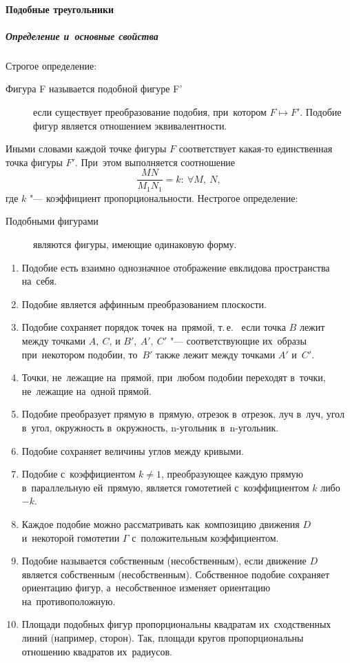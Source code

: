 \documentclass[]{scrartcl}
\begin{document}
\paragraph{Подобные треугольники}
\subparagraph{Определение и~основные свойства}
Строгое определение:
\begin{description}
	\item[Фигура F называется подобной фигуре F'] если существует преобразование подобия, при~котором ${\textstyle F \mapsto F'}$. Подобие фигур является отношением эквивалентности.
\end{description}
Иными словами каждой точке фигуры $\textstyle F$ соответствует какая-то единственная точка фигуры $\textstyle F'$. При~этом выполняется соотношение
\begin{equation}\label{eq:similar-figures-1}
\frac{MN}{M_{1}N_{1}}=k:\ \forall M,\ N,
\end{equation}
где $\textstyle k$ "--- коэффициент пропорциональности.
Нестрогое определение:
\begin{description}
	\item[Подобными фигурами] являются фигуры, имеющие одинаковую форму. 
\end{description}

\begin{enumerate}
	\item Подобие есть взаимно однозначное отображение евклидова пространства на~себя.
	\item Подобие является аффинным преобразованием плоскости.
	\item Подобие сохраняет порядок точек на~прямой, т.\,е.~ если точка ${\textstyle B}$ лежит между точками ${\textstyle A,\ C}$, и ${\textstyle B',\ A',\ C'}$ "--- соответствующие их~образы при~некотором подобии, то~${\textstyle B'}$ также лежит между точками ${\textstyle A'}$ и~${\textstyle C'}$.
	\item Точки, не~лежащие на~прямой, при~любом подобии переходят в~точки, не~лежащие на~одной прямой.
	\item Подобие преобразует прямую в~прямую, отрезок в~отрезок, луч в~луч, угол в~угол, окружность в~окружность, n-угольник в~n-угольник.
	\item Подобие сохраняет величины углов между кривыми.
	\item Подобие с~коэффициентом ${\textstyle k\not =1}$, преобразующее каждую прямую в~параллельную ей~прямую, является гомотетией с~коэффициентом ${\textstyle k}$ либо ${\textstyle -k}$.
	\item Каждое подобие можно рассматривать как~композицию движения ${\textstyle D}$ и~некоторой гомотетии ${\textstyle \Gamma}$ с~положительным коэффициентом.
	\item Подобие называется собственным (несобственным), если движение ${\textstyle D}$ является собственным (несобственным). Собственное подобие сохраняет ориентацию фигур, а~несобственное изменяет ориентацию на~противоположную.
	\item Площади подобных фигур пропорциональны квадратам их~сходственных линий (например, сторон). Так, площади кругов пропорциональны отношению квадратов их~радиусов.
\end{enumerate}
 
\end{document}
